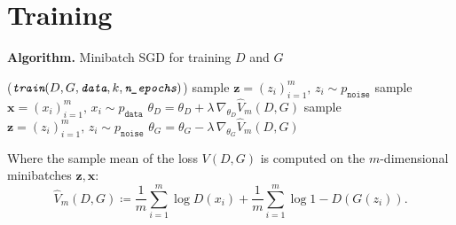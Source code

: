 \documentclass{beamer}
\begin{document}
	
	\section{Training}

	\begin{frame}
		\setlength{\algomargin}{2em}
		\begin{algorithm}[H]
			\caption{\vspace{-0.07cm}\textbf{Algorithm.} Minibatch SGD for training $D$ and $G$}
			\DontPrintSemicolon
			\Function($\textit{\texttt{train}}{(D, G, \textit{\texttt{data}}, k, \textit{\texttt{n\_epochs}})}$){
				{
					{
						sample $\mathbf{z} = (z_i)_{i = 1}^{m}, \, z_i \sim p_{\texttt{noise}}$ \;
						sample $\mathbf{x} = (x_i)_{i = 1}^{m}, \, x_i \sim p_{\texttt{data}}$ \;
						$\theta_D = \theta_D + \lambda \, \nabla_{\theta_D} \widehat{V}_m(D, G)$ \;
					}
				sample $\mathbf{z} = (z_i)_{i = 1}^{m}, \, z_i \sim p_{\texttt{noise}}$ \;
				$\theta_G = \theta_G - \lambda \, \nabla_{\theta_G} \widehat{V}_m(D, G)$ \;
				}
			}
		\end{algorithm}
		\medskip 
		Where the sample mean of the loss $V(D, G)$ is computed on the $m$-dimensional minibatches $\mathbf{z}, \mathbf{x}$:
		\vspace{-0.2cm}
		\begin{equation*}
			\widehat{V}_m(D, G) \coloneqq \frac{1}{m} \sum_{i = 1}^{m} \log{D(x_i)} + \frac{1}{m} \sum_{i = 1}^{m} \log{1 - D(G(z_i))}.
		\end{equation*}
	\end{frame}
\end{document}
